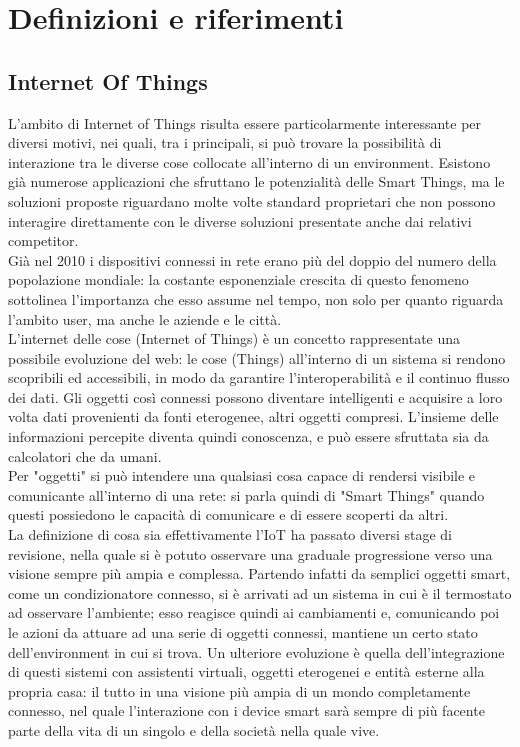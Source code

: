 \documentclass[12pt,a4paper,openright,oneside]{report}
\begin{document}
\clearpage{\pagestyle{empty}\cleardoublepage}
\chapter{Definizioni e riferimenti}
\section{Internet Of Things}
L'ambito di Internet of Things \cite{iot} risulta essere particolarmente interessante per diversi motivi, nei quali, tra i principali, si può trovare la possibilità di interazione tra le diverse cose collocate all'interno di un environment. Esistono già numerose applicazioni che sfruttano le potenzialità delle Smart Things, ma le soluzioni proposte riguardano molte volte standard proprietari che non possono interagire direttamente con le diverse soluzioni presentate anche dai relativi competitor.\\

Già nel 2010 i dispositivi connessi in rete erano più del doppio del numero della popolazione mondiale: la costante esponenziale crescita di questo fenomeno sottolinea l'importanza che esso assume nel tempo, non solo per quanto riguarda l'ambito user, ma anche le aziende e le città.\\

L'internet delle cose (Internet of Things) è un concetto rappresentate una possibile evoluzione del web: le cose (Things) all'interno di un sistema si rendono scopribili ed accessibili, in modo da garantire l'interoperabilità e il continuo flusso dei dati. Gli oggetti così connessi possono diventare intelligenti e acquisire a loro volta dati provenienti da fonti eterogenee, altri oggetti compresi. L'insieme delle informazioni percepite diventa quindi conoscenza, e può essere sfruttata sia da calcolatori che da umani.\\

Per "oggetti" \cite{smartthing} si può intendere una qualsiasi cosa capace di rendersi visibile e comunicante all'interno di una rete: si parla quindi di "Smart Things" quando questi possiedono le capacità di comunicare e di essere scoperti da altri.\\

La definizione di cosa sia effettivamente l'IoT ha passato diversi stage di revisione, nella quale si è potuto osservare una graduale progressione verso una visione sempre più ampia e complessa. Partendo infatti da semplici oggetti smart, come un condizionatore connesso, si è arrivati ad un sistema in cui è il termostato ad osservare l'ambiente; esso reagisce quindi ai cambiamenti e, comunicando poi le azioni da attuare ad una serie di oggetti connessi, mantiene un certo stato dell'environment in cui si trova. Un ulteriore evoluzione è quella dell'integrazione di questi sistemi con assistenti virtuali, oggetti eterogenei e entità esterne alla propria casa: il tutto in una visione più ampia di un mondo completamente connesso, nel quale l'interazione con i device smart sarà sempre di più facente parte della vita di un singolo e della società nella quale vive.\\
\end{document}
